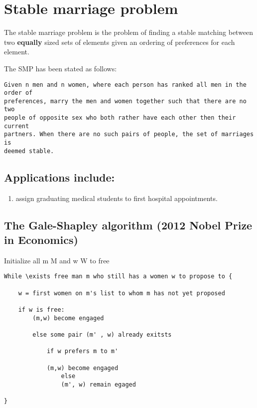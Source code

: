 \documentclass{minimal}
\begin{document}
\section{Stable marriage problem}\label{stable-marriage-problem}

The stable marriage problem is the problem of finding a stable matching
between two \textbf{equally} sized sets of elements given an ordering of
preferences for each element.

The SMP has been stated as follows:

\begin{verbatim}
Given n men and n women, where each person has ranked all men in the order of
preferences, marry the men and women together such that there are no two
people of opposite sex who both rather have each other then their current
partners. When there are no such pairs of people, the set of marriages is
deemed stable.  
\end{verbatim}

\subsection{Applications include:}\label{applications-include}

\begin{enumerate}
\def\labelenumi{\arabic{enumi}.}
\tightlist
\item
  assign graduating medical students to first hospital appointments.
\end{enumerate}

\subsection{The Gale-Shapley algorithm (2012 Nobel Prize in
Economics)}\label{the-gale-shapley-algorithm-2012-nobel-prize-in-economics}

Initialize all m \epsilon  M and w \epsilon  W to free

\begin{verbatim}
While \exists free man m who still has a women w to propose to {
    
    w = first women on m's list to whom m has not yet proposed

    if w is free:
        (m,w) become engaged

        else some pair (m' , w) already exitsts

            if w prefers m to m'

            (m,w) become engaged
                else 
                (m', w) remain egaged

} 
\end{verbatim}
\end{document}
